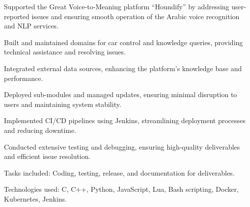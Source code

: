 \begin{resume_list}
    \item Supported the Great Voice-to-Meaning platform “Houndify” by addressing user-reported issues and ensuring smooth operation of the Arabic voice recognition and NLP services.
    \item Built and maintained domains for car control and knowledge queries, providing technical assistance and resolving issues.
    \item Integrated external data sources, enhancing the platform’s knowledge base and performance.
    \item Deployed sub-modules and managed updates, ensuring minimal disruption to users and maintaining system stability.
    \item Implemented CI/CD pipelines using Jenkins, streamlining deployment processes and reducing downtime.
    \item Conducted extensive testing and debugging, ensuring high-quality deliverables and efficient issue resolution.
    \item Tasks included: Coding, testing, release, and documentation for deliverables.
    \item Technologies used: C, C++, Python, JavaScript, Lua, Bash scripting, Docker, Kubernetes, Jenkins.
\end{resume_list}

